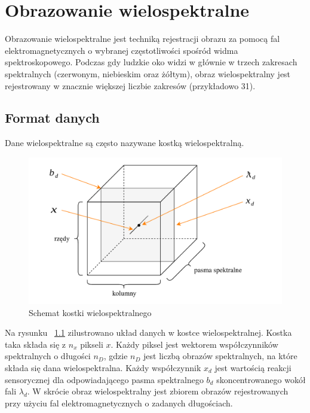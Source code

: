 
\chapter{Obrazowanie wielospektralne}
Obrazowanie wielospektralne jest techniką rejestracji obrazu za pomocą fal elektromagnetycznych o wybranej częstotliwości spośród widma spektroskopowego. Podczas gdy ludzkie oko widzi w głównie w trzech zakresach spektralnych (czerwonym, niebieskim oraz żółtym), obraz wielospektralny jest rejestrowany w znacznie większej liczbie zakresów (przykładowo 31).

\section{Format danych}
 Dane wielospektralne są często nazywane kostką wielospektralną. 

\begin{figure}[ht]
	\centering
		\includegraphics[width=0.75\linewidth]{rys02/multispectral-cube-vector}
	\caption{Schemat kostki wielospektralnego}
	\label{fig:multispectral-cube}	
\end{figure}

Na rysunku ~\ref{fig:multispectral-cube} zilustrowano układ danych w kostce wielospektralnej. Kostka taka składa się z $n_x$ pikseli $x$. Każdy piksel jest wektorem współczynników spektralnych o długości  $n_D$, gdzie $n_D$ jest liczbą obrazów spektralnych, na które składa się dana wielospektralna. Każdy współczynnik $x_d$ jest wartością reakcji sensorycznej dla odpowiadającego pasma spektralnego $b_d$ skoncentrowanego wokół fali $\lambda_d$. W skrócie obraz wielospektralny jest zbiorem obrazów rejestrowanych przy użyciu fal elektromagnetycznych o zadanych długościach. 


